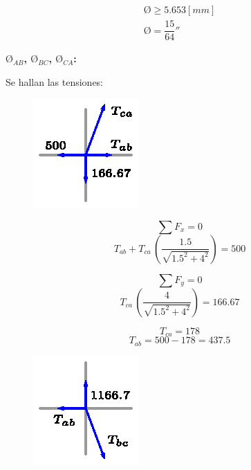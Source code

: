 \documentclass[letter,10pt,twoside]{article}
\begin{document}
\begin{equation*}
\boxed{
    \begin{array}{l}
        \text{\O} \ge 5.653[mm] \\
        \text{\O} = \dfrac{15}{64}''
    \end{array}
}
\end{equation*}

\textbf{$\text{\O}_{AB}$, $\text{\O}_{BC}$, $\text{\O}_{CA}$:}

Se hallan las tensiones:

\begin{figure}[H]
\centering
\includegraphics[scale=1.8]{resources/x0401.eps}
\end{figure}

\begin{equation*}
    \sum{F_x} = 0
\end{equation*}
\begin{equation*}
    T_{ab} + T_{ca}\,\left(\frac{1.5}{\sqrt{1.5^2+4^2}}\right) = 500
\end{equation*}

\begin{equation*}
    \sum{F_y} = 0
\end{equation*}
\begin{equation*}
    T_{ca}\,\left(\frac{4}{\sqrt{1.5^2+4^2}}\right) = 166.67
\end{equation*}

\begin{equation*}
    T_{ca} = 178
\end{equation*}
\begin{equation*}
    T_{ab} = 500 - 178 = 437.5
\end{equation*}

\begin{figure}[H]
\centering
\includegraphics[scale=1.8]{resources/x0402.eps}
\end{figure}
\end{document}
